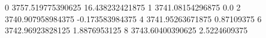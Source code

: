 0 3757.519775390625 16.438232421875
1 3741.08154296875 0.0
2 3740.907958984375 -0.173583984375
4 3741.95263671875 0.87109375
6 3742.96923828125 1.8876953125
8 3743.60400390625 2.5224609375
